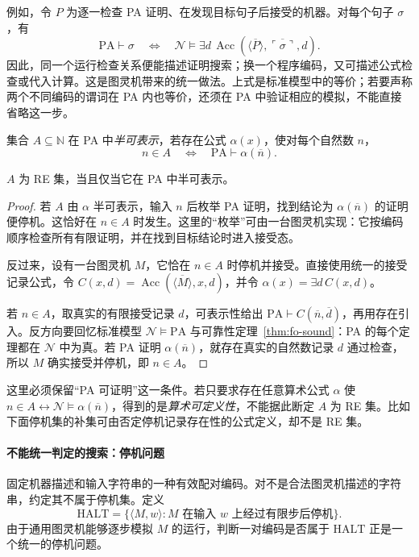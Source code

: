 \documentclass[lang=cn,a4paper,fontset=none,zihao=false,10pt,openany,twoside]{beautybook}
\numberwithin{algorithm}{chapter}
\newcommand{\N}{\mathbb N}
\begin{document}
例如，令 $P$ 为逐一检查 PA 证明、在发现目标句子后接受的机器。对每个句子 $\sigma$，有
\[
 \mathrm{PA}\vdash\sigma
 \quad\Longleftrightarrow\quad
 \mathcal N\models\exists d\,
 \operatorname{Acc}(\overline{\langle P\rangle},
 \overline{\ulcorner\sigma\urcorner},d).
\]
因此，同一个运行检查关系便能描述证明搜索；换一个程序编码，又可描述公式检查或代入计算。这是图灵机带来的统一做法。上式是标准模型中的等价；若要声称两个不同编码的谓词在 PA 内也等价，还须在 PA 中验证相应的模拟，不能直接省略这一步。

\begin{definition}[半可表示性]
集合 $A\subseteq\N$ 在 PA 中\emph{半可表示}，若存在公式 $\alpha(x)$，使对每个自然数 $n$，
\[
 n\in A\quad\Longleftrightarrow\quad\mathrm{PA}\vdash\alpha(\overline n).
\]
\end{definition}

\begin{proposition}[可枚举性与半可表示性]
$A$ 为 RE 集，当且仅当它在 PA 中半可表示。
\end{proposition}
\begin{proof}
若 $A$ 由 $\alpha$ 半可表示，输入 $n$ 后枚举 PA 证明，找到结论为 $\alpha(\overline n)$ 的证明便停机。这恰好在 $n\in A$ 时发生。这里的“枚举”可由一台图灵机实现：它按编码顺序检查所有有限证明，并在找到目标结论时进入接受态。

反过来，设有一台图灵机 $M$，它恰在 $n\in A$ 时停机并接受。直接使用统一的接受记录公式，令 $C(x,d)=\operatorname{Acc}(\overline{\langle M\rangle},x,d)$，并令 $\alpha(x)=\exists d\,C(x,d)$。

若 $n\in A$，取真实的有限接受记录 $d$，可表示性给出 $\mathrm{PA}\vdash C(\overline n,\overline d)$，再用存在引入。反方向要回忆标准模型 $\mathcal N\models\mathrm{PA}$ 与可靠性定理~\ref{thm:fo-sound}：PA 的每个定理都在 $\mathcal N$ 中为真。若 PA 证明 $\alpha(\overline n)$，就存在真实的自然数记录 $d$ 通过检查，所以 $M$ 确实接受并停机，即 $n\in A$。
\end{proof}

\begin{remark}
这里必须保留“PA 可证明”这一条件。若只要求存在任意算术公式 $\alpha$ 使 $n\in A\leftrightarrow\mathcal N\models\alpha(\overline n)$，得到的是\emph{算术可定义性}，不能据此断定 $A$ 为 RE 集。比如下面停机集的补集可由否定停机记录存在性的公式定义，却不是 RE 集。
\end{remark}

\paragraph{不能统一判定的搜索：停机问题}
\begin{definition}[停机集]
固定机器描述和输入字符串的一种有效配对编码。对不是合法图灵机描述的字符串，约定其不属于停机集。定义
\[
 \mathrm{HALT}=\{\langle M,w\rangle:
   M\text{ 在输入 }w\text{ 上经过有限步后停机}\}.
\]
由于通用图灵机能够逐步模拟 $M$ 的运行，判断一对编码是否属于 $\mathrm{HALT}$ 正是一个统一的停机问题。
\end{definition}
\end{document}
